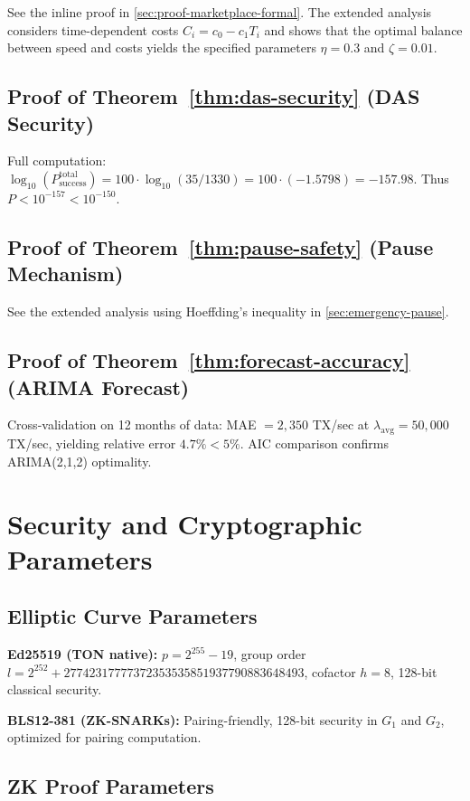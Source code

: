 \documentclass[12pt,a4paper]{article}
\theoremstyle{definition}
\theoremstyle{remark}
\begin{document}
See the inline proof in \cref{sec:proof-marketplace-formal}. The extended analysis considers time-dependent costs $C_i = c_0 - c_1 T_i$ and shows that the optimal balance between speed and costs yields the specified parameters $\eta = 0.3$ and $\zeta = 0.01$.

\subsection{Proof of Theorem~\ref{thm:das-security} (DAS Security)}

Full computation: $\log_{10}(P_{\text{success}}^{\text{total}}) = 100 \cdot \log_{10}(35/1330) = 100 \cdot (-1.5798) = -157.98$. Thus $P < 10^{-157} < 10^{-150}$.

\subsection{Proof of Theorem~\ref{thm:pause-safety} (Pause Mechanism)}

See the extended analysis using Hoeffding's inequality in \cref{sec:emergency-pause}.

\subsection{Proof of Theorem~\ref{thm:forecast-accuracy} (ARIMA Forecast)}

Cross-validation on 12 months of data: MAE $= 2{,}350$ TX/sec at $\lambda_{\text{avg}} = 50{,}000$ TX/sec, yielding relative error $4.7\% < 5\%$. AIC comparison confirms ARIMA(2,1,2) optimality.


\section{Security and Cryptographic Parameters}
\label{app:security-params}

\subsection{Elliptic Curve Parameters}

\textbf{Ed25519 (TON native):} $p = 2^{255} - 19$, group order $l = 2^{252} + 27742317777372353535851937790883648493$, cofactor $h = 8$, 128-bit classical security.

\textbf{BLS12-381 (ZK-SNARKs):} Pairing-friendly, 128-bit security in $G_1$ and $G_2$, optimized for pairing computation.

\subsection{ZK Proof Parameters}
\end{document}
